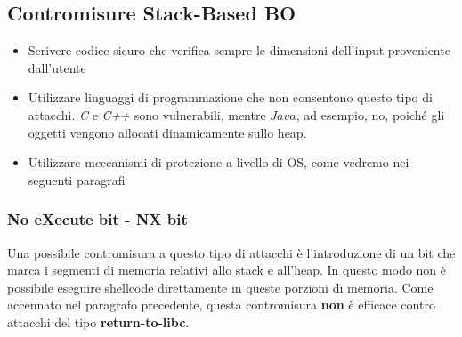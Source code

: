 \subsection{Contromisure Stack-Based BO}
\begin{itemize}
  \item Scrivere codice sicuro che verifica sempre le dimensioni dell'input proveniente dall'utente 
  \item Utilizzare linguaggi di programmazione che non consentono questo tipo di attacchi. \textit{C} e \textit{C++} sono vulnerabili, mentre $Java$, ad esempio, no, poiché gli oggetti vengono allocati dinamicamente sullo heap.
  \item Utilizzare meccanismi di protezione a livello di OS, come vedremo nei seguenti paragrafi
\end{itemize}
\subsubsection{No eXecute bit - NX bit}
Una possibile contromisura a questo tipo di attacchi è l'introduzione di un bit che marca i segmenti di memoria relativi allo stack e all'heap. In questo modo non è possibile eseguire shellcode direttamente in queste porzioni di memoria. Come accennato nel paragrafo precedente, questa contromisura \textbf{non} è efficace contro attacchi del tipo \textbf{return-to-libc}.
